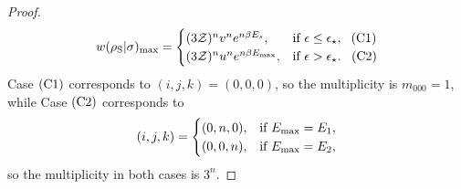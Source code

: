 \documentclass[pra,
aps,
twocolumn,
superscriptaddress,
groupedaddress,
nofootinbib,
reprint
]{revtex4-1}
\begin{document}
\begin{proof}
\begin{equation*}
w(\rho_{\rm{S}} | \sigma)_{\rm{max}} =
	\begin{cases}
		(3\mathcal{Z})^{n} v^n e^{n\beta E_s}, &\mbox{if }\epsilon \leq \epsilon_{\star},\ \hspace{3pt}\rm{(C1)}\\
		(3\mathcal{Z})^{n} u^n e^{n\beta E_{\rm{max}}}, &\mbox{if }\epsilon > \epsilon_{\star}.\ \hspace{5pt}\rm{(C2)} 
	\end{cases}
\end{equation*}
Case $\rm{(C1)}$ corresponds to $(i,j,k) = (0,0,0)$, so the multiplicity is $m_{000} = 1$, while
Case $\rm{(C2)}$ corresponds to
\begin{equation}
	(i,j,k) = 
	\begin{cases}
	(0,n,0), &\text{if } E_{\rm{max}} = E_1, \\
	(0,0,n), &\text{if } E_{\rm{max}} = E_2,
	\end{cases}
\end{equation}
so the multiplicity in both cases is $3^n$.


\end{proof}
\end{document}
